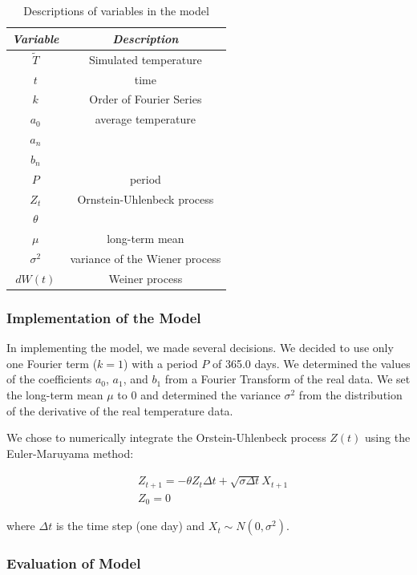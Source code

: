 \documentclass[11pt, letterpaper]{article}
\begin{document}
\begin{table}[H]
  \centering
  \begin{tabular}{c c} \hline
  \emph{Variable} & \emph{Description}\\ \hline
  $\tilde{T}$ & Simulated temperature \\ \hline
  $t$ & time \\ \hline
  $k$ & Order of Fourier Series \\ \hline
  $a_0$ & average temperature \\ \hline
  $a_n$ & \\ \hline
  $b_n$ &  \\ \hline
  $P$ & period  \\ \hline
  $Z_t$ & Ornstein-Uhlenbeck process \\ \hline
  $\theta$ & \\ \hline
  $\mu$ & long-term mean \\ \hline
  $\sigma^2$ & variance of the Wiener process \\ \hline
  $dW(t)$ & Weiner process \\ \hline 
  \end{tabular}
  \caption{Descriptions of variables in the model}
  \label{tab:analysis-ft-values}
\end{table}


\subsubsection{Implementation of the Model}
In implementing the model, we made several decisions.  We decided to use only one Fourier term ($k=1$) with a period $P$ of 365.0 days.  We determined the values of the coefficients $a_0$, $a_1$, and $b_1$ from a Fourier Transform of the real data.  We set the long-term mean $\mu$ to 0 and determined the variance $\sigma^2$ from the distribution of the derivative of the real temperature data.

We chose to numerically integrate the Orstein-Uhlenbeck process $Z(t)$ using the Euler-Maruyama method:

\begin{align}
&Z_{t+1} = - \theta Z_t \Delta t + \sqrt{\sigma \Delta t} X_{t+1} \\
&Z_0 = 0
\end{align}

where $\Delta t$ is the time step (one day) and $X_t \sim N(0, \sigma^2)$.

\subsubsection{Evaluation of Model}
\end{document}
